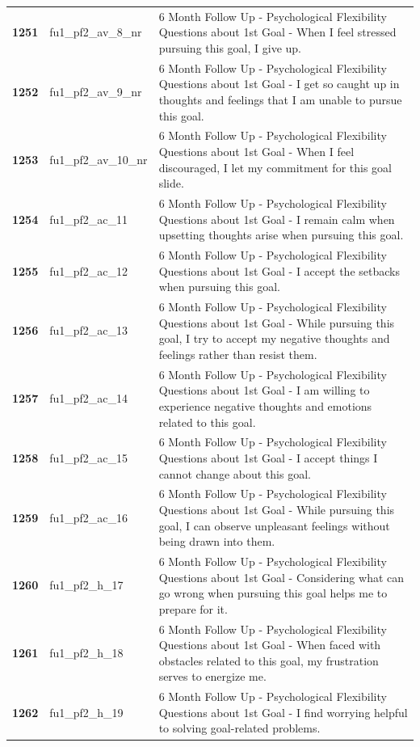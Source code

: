 \documentclass[
  letterpaper,
  DIV=11,
  numbers=noendperiod]{scrartcl}
\begin{document}
\begin{longtable}[t]{>{}cll}
\addlinespace
\textbf{1251} & fu1\_pf2\_av\_8\_nr & 6 Month Follow Up - Psychological Flexibility Questions about 1st Goal - When I feel stressed pursuing this goal, I give up.\\
\textbf{1252} & fu1\_pf2\_av\_9\_nr & 6 Month Follow Up - Psychological Flexibility Questions about 1st Goal - I get so caught up in thoughts and feelings that I am unable to pursue this goal.\\
\textbf{1253} & fu1\_pf2\_av\_10\_nr & 6 Month Follow Up - Psychological Flexibility Questions about 1st Goal - When I feel discouraged, I let my commitment for this goal slide.\\
\textbf{1254} & fu1\_pf2\_ac\_11 & 6 Month Follow Up - Psychological Flexibility Questions about 1st Goal - I remain calm when upsetting thoughts arise when pursuing this goal.\\
\textbf{1255} & fu1\_pf2\_ac\_12 & 6 Month Follow Up - Psychological Flexibility Questions about 1st Goal - I accept the setbacks when pursuing this goal.\\
\addlinespace
\textbf{1256} & fu1\_pf2\_ac\_13 & 6 Month Follow Up - Psychological Flexibility Questions about 1st Goal - While pursuing this goal, I try to accept my negative thoughts and feelings rather than resist them.\\
\textbf{1257} & fu1\_pf2\_ac\_14 & 6 Month Follow Up - Psychological Flexibility Questions about 1st Goal - I am willing to experience negative thoughts and emotions related to this goal.\\
\textbf{1258} & fu1\_pf2\_ac\_15 & 6 Month Follow Up - Psychological Flexibility Questions about 1st Goal - I accept things I cannot change about this goal.\\
\textbf{1259} & fu1\_pf2\_ac\_16 & 6 Month Follow Up - Psychological Flexibility Questions about 1st Goal - While pursuing this goal, I can observe unpleasant feelings without being drawn into them.\\
\textbf{1260} & fu1\_pf2\_h\_17 & 6 Month Follow Up - Psychological Flexibility Questions about 1st Goal - Considering what can go wrong when pursuing this goal helps me to prepare for it.\\
\addlinespace
\textbf{1261} & fu1\_pf2\_h\_18 & 6 Month Follow Up - Psychological Flexibility Questions about 1st Goal - When faced with obstacles related to this goal, my frustration serves to energize me.\\
\textbf{1262} & fu1\_pf2\_h\_19 & 6 Month Follow Up - Psychological Flexibility Questions about 1st Goal - I find worrying helpful to solving goal-related problems.\\

\end{longtable}
\end{document}
